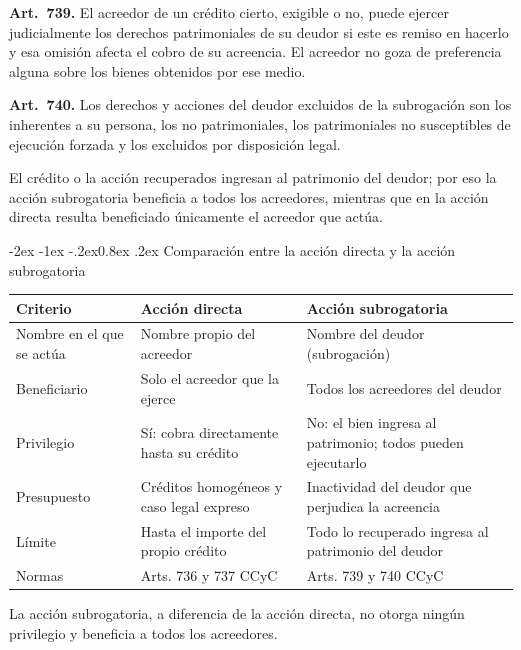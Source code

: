 \documentclass[12pt,oneside]{book}
\makeatletter
\renewcommand\subsubsection{\@startsection{subsubsection}{3}{\z@}%
  {-2ex \@plus -1ex \@minus -.2ex}{0.8ex \@plus .2ex}%
  {\normalfont\normalsize\bfseries\itshape}}
\newenvironment{tabla}{%
    \par\medskip\begingroup\small\renewcommand{\arraystretch}{1.3}\noindent\ignorespaces
}{%
    \par\endgroup\medskip
}
\makeatother
\begin{document}
\begin{regla}
\textbf{Art.~739.} El acreedor de un crédito cierto, exigible o no, puede ejercer judicialmente los derechos patrimoniales de su deudor si este es remiso en hacerlo y esa omisión afecta el cobro de su acreencia. El acreedor no goza de preferencia alguna sobre los bienes obtenidos por ese medio.

\smallskip
\textbf{Art.~740.} Los derechos y acciones del deudor excluidos de la subrogación son los inherentes a su persona, los no patrimoniales, los patrimoniales no susceptibles de ejecución forzada y los excluidos por disposición legal.
\end{regla}

El crédito o la acción recuperados ingresan al patrimonio del deudor; por eso la acción subrogatoria beneficia a todos los acreedores, mientras que en la acción directa resulta beneficiado únicamente el acreedor que actúa.

\subsubsection{Comparación entre la acción directa y la acción subrogatoria}

\begin{tabla}
\begin{tabularx}{\textwidth}{B{3.4cm}YY}
\toprule
Criterio & \textbf{Acción directa} & \textbf{Acción subrogatoria} \\
\midrule
Nombre en el que se actúa & Nombre propio del acreedor & Nombre del deudor (subrogación) \\
Beneficiario & Solo el acreedor que la ejerce & Todos los acreedores del deudor \\
Privilegio & Sí: cobra directamente hasta su crédito & No: el bien ingresa al patrimonio; todos pueden ejecutarlo \\
Presupuesto & Créditos homogéneos y caso legal expreso & Inactividad del deudor que perjudica la acreencia \\
Límite & Hasta el importe del propio crédito & Todo lo recuperado ingresa al patrimonio del deudor \\
Normas & Arts. 736 y 737 CCyC & Arts. 739 y 740 CCyC \\
\bottomrule
\end{tabularx}
\end{tabla}

\begin{importante}
La acción subrogatoria, a diferencia de la acción directa, no otorga ningún privilegio y beneficia a todos los acreedores.
\end{importante}
\end{document}
